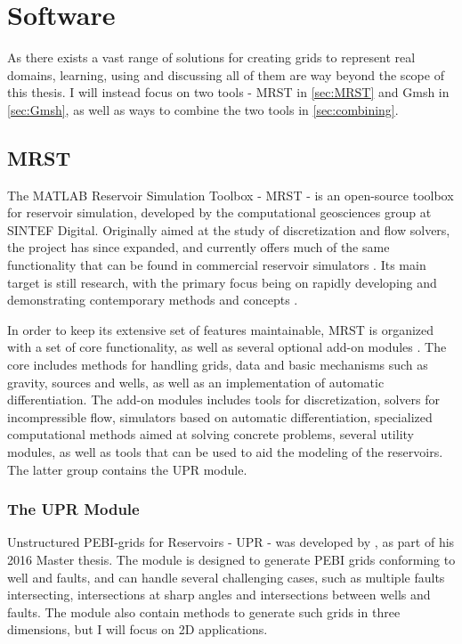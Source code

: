 \section{Software}
As there exists a vast range of solutions for creating grids to represent real domains, learning, using and discussing all of them are way beyond the scope of this thesis. I will instead focus on two tools - MRST in \autoref{sec:MRST} and Gmsh in \autoref{sec:Gmsh}, as well as ways to combine the two tools in \autoref{sec:combining}. 

\subsection{MRST}
\label{sec:MRST}
The MATLAB Reservoir Simulation Toolbox - MRST - is an open-source toolbox for reservoir simulation, developed by the computational geosciences group at SINTEF Digital. Originally aimed at the study of discretization and flow solvers, the project has since expanded, and currently offers much of the same functionality that can be found in commercial reservoir simulators \cite{MRST_book}. Its main target is still research, with the primary focus being on rapidly developing and demonstrating contemporary methods and concepts \cite{MRST_website}.

In order to keep its extensive set of features maintainable, MRST is organized with a set of core functionality, as well as several optional add-on modules \cite{MRST_book}. The core includes methods for handling grids, data and basic mechanisms such as gravity, sources and wells, as well as an implementation of automatic differentiation. The add-on modules includes tools for discretization, solvers for incompressible flow, simulators based on automatic differentiation, specialized computational methods aimed at solving concrete problems, several utility modules, as well as tools that can be used to aid the modeling of the reservoirs. The latter group contains the UPR module.


\subsubsection{The UPR Module}
\label{sec:UPR}
Unstructured PEBI-grids for Reservoirs - UPR - was developed by \textcite{UPR_thesis}, as part of his 2016 Master thesis. The module is designed to generate PEBI grids conforming to well and faults, and can handle several challenging cases, such as multiple faults intersecting, intersections at sharp angles and intersections between wells and faults. The module also contain methods to generate such grids in three dimensions, but I will focus on 2D applications.

